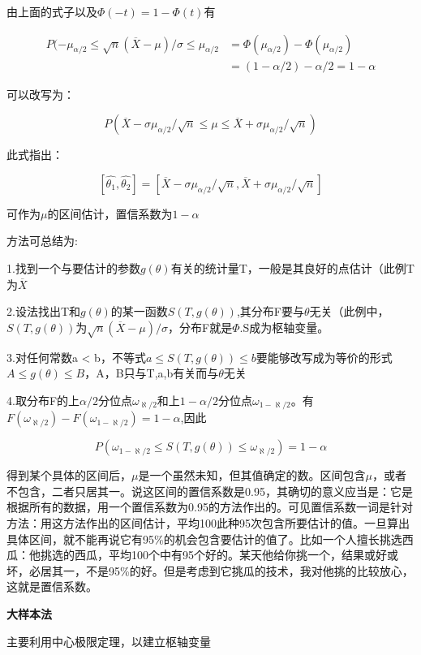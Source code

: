 \documentclass{ctexart}
\begin{document}
	由上面的式子以及\(\varPhi(-t)=1-\varPhi(t)\)有
	
	\begin{align*}
	P(-\mu_{\alpha/2} \leq \sqrt{n}(\overline{X}-\mu)/\sigma \leq \mu_{\alpha/2} & = \varPhi(\mu_{\alpha/2})-\varPhi(\mu_{\alpha/2}) \\
			& = (1-\alpha/2)-\alpha/2 = 1- \alpha
	\end{align*}
	
	可以改写为：
	
	\[P(\overline{X}-\sigma\mu_{\alpha/2}/\sqrt{n} \leq \mu \leq \overline{X}+\sigma\mu_{\alpha/2}/\sqrt{n})\]
	
	此式指出：
	
	\[[\hat{\theta_1},\hat{\theta_2}]=[\overline{X}-\sigma\mu_{\alpha/2}/\sqrt{n}, \overline{X}+\sigma\mu_{\alpha/2}/\sqrt{n}]\]
	
	可作为\(\mu\)的区间估计，置信系数为\(1-\alpha\)
	
	方法可总结为:
	
	1.找到一个与要估计的参数\(g(\theta)\)有关的统计量T，一般是其良好的点估计（此例T为\(\overline{X}\)
	
	2.设法找出T和\(g(\theta)\)的某一函数\(S(T,g(\theta))\),其分布F要与\(\theta\)无关（此例中，\(S(T,g(\theta))\)为\(\sqrt{n}(\overline{X}-\mu)/\sigma\)，分布F就是\(\varPhi\).S成为枢轴变量。
	
	3.对任何常数a < b，不等式\(a \leq S(T,g(\theta)) \leq b\)要能够改写成为等价的形式\(A \leq g(\theta) \leq B\)，A，B只与T,a,b有关而与\(\theta\)无关
	
	4.取分布F的上\(\alpha/2\)分位点\(\omega_{\aleph/2}\)和上\(1-\alpha/2\)分位点\(\omega_{1-\aleph/2}\)。有\(F(\omega_{\aleph/2})-F(\omega_{1-\aleph/2})=1-\alpha\),因此
	
	\[P(\omega_{1-\aleph/2} \leq S(T, g(\theta)) \leq \omega_{\aleph/2})=1-\alpha\]
	
	得到某个具体的区间后，\(\mu\)是一个虽然未知，但其值确定的数。区间包含\(\mu\)，或者不包含，二者只居其一。说这区间的置信系数是0.95，其确切的意义应当是：它是根据所有的数据，用一个置信系数为0.95的方法作出的。可见置信系数一词是针对方法：用这方法作出的区间估计，平均100此种95次包含所要估计的值。一旦算出具体区间，就不能再说它有95\%的机会包含要估计的值了。比如一个人擅长挑选西瓜：他挑选的西瓜，平均100个中有95个好的。某天他给你挑一个，结果或好或坏，必居其一，不是95\%的好。但是考虑到它挑瓜的技术，我对他挑的比较放心，这就是置信系数。
	
	\textbf{大样本法}
	
	主要利用中心极限定理，以建立枢轴变量
	
\end{document}
